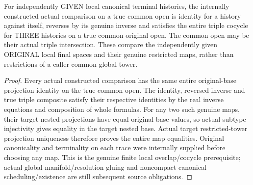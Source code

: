 \begin{theorem}
\label{hir:original-independent-local-terminal-overlap-identity-inverse-cocycle}
\leanok
For independently GIVEN local canonical terminal histories, the internally
constructed actual comparison on a true common open is identity for a
history against itself, reverses by its genuine inverse and satisfies the
entire triple cocycle for THREE histories on a true common original open.
The common open may be their actual triple intersection. These compare
the independently given ORIGINAL local final spaces and their genuine
restricted maps, rather than restrictions of a caller common global tower.
\end{theorem}
\begin{proof}
Every actual constructed comparison has the same entire original-base
projection identity on the true common open. The identity, reversed
inverse and true triple composite satisfy their respective identities
by the real inverse equations and composition of whole formulas. For
any two such genuine maps, their target nested projections have equal
original-base values, so actual subtype injectivity gives equality in the
target nested base. Actual target restricted-tower projection uniqueness
therefore proves the entire map equalities. Original canonicality and
terminality on each trace were internally supplied before choosing any
map. This is the genuine finite local overlap/cocycle prerequisite;
actual global manifold/resolution gluing and noncompact canonical
scheduling/existence are still subsequent source obligations.
\end{proof}
